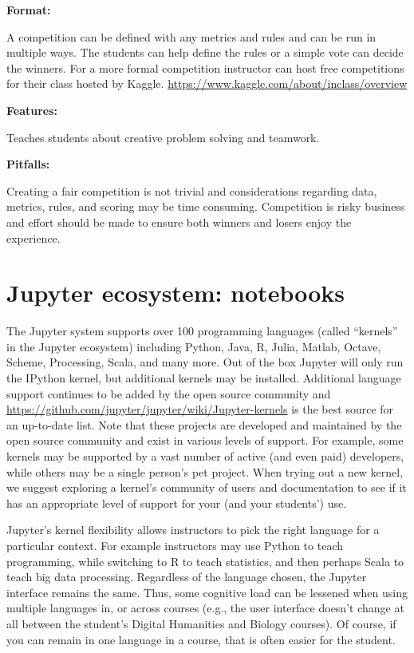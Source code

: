 \documentclass[]{book}
\begin{document}
\textbf{Format:}

A competition can be defined with any metrics and rules and can be run
in multiple ways. The students can help define the rules or a simple
vote can decide the winners. For a more formal competition instructor
can host free competitions for their class hosted by Kaggle.
\url{https://www.kaggle.com/about/inclass/overview}

\textbf{Features:}

Teaches students about creative problem solving and teamwork.

\textbf{Pitfalls:}

Creating a fair competition is not trivial and considerations regarding
data, metrics, rules, and scoring may be time consuming. Competition is
risky business and effort should be made to ensure both winners and
losers enjoy the experience.

\chapter{Jupyter ecosystem:
notebooks}\label{jupyter-ecosystem-notebooks}

The Jupyter system supports over 100 programming languages (called
``kernels'' in the Jupyter ecosystem) including Python, Java, R, Julia,
Matlab, Octave, Scheme, Processing, Scala, and many more. Out of the box
Jupyter will only run the IPython kernel, but additional kernels may be
installed. Additional language support continues to be added by the open
source community and
\url{https://github.com/jupyter/jupyter/wiki/Jupyter-kernels} is the
best source for an up-to-date list. Note that these projects are
developed and maintained by the open source community and exist in
various levels of support. For example, some kernels may be supported by
a vast number of active (and even paid) developers, while others may be
a single person's pet project. When trying out a new kernel, we suggest
exploring a kernel's community of users and documentation to see if it
has an appropriate level of support for your (and your students') use.

Jupyter's kernel flexibility allows instructors to pick the right
language for a particular context. For example instructors may use
Python to teach programming, while switching to R to teach statistics,
and then perhaps Scala to teach big data processing. Regardless of the
language chosen, the Jupyter interface remains the same. Thus, some
cognitive load can be lessened when using multiple languages in, or
across courses (e.g., the user interface doesn't change at all between
the student's Digital Humanities and Biology courses). Of course, if you
can remain in one language in a course, that is often easier for the
student.
\end{document}
